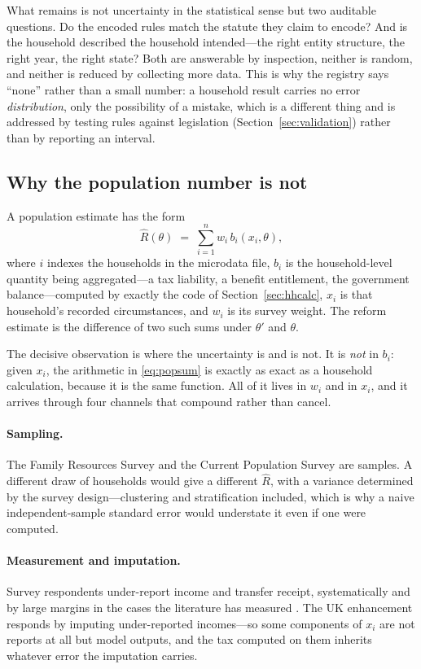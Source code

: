 What remains is not uncertainty in the statistical sense but two auditable questions. Do the encoded rules match the statute they claim to encode? And is the household described the household intended---the right entity structure, the right year, the right state? Both are answerable by inspection, neither is random, and neither is reduced by collecting more data. This is why the registry says ``none'' rather than a small number: a household result carries no error \emph{distribution}, only the possibility of a mistake, which is a different thing and is addressed by testing rules against legislation (Section~\ref{sec:validation}) rather than by reporting an interval.

\subsection{Why the population number is not}

A population estimate has the form
\begin{equation}
  \widehat{R}(\theta) \;=\; \sum_{i=1}^{n} w_i \, b_i(x_i, \theta),
  \label{eq:popsum}
\end{equation}
where $i$ indexes the households in the microdata file, $b_i$ is the household-level quantity being aggregated---a tax liability, a benefit entitlement, the government balance---computed by exactly the code of Section~\ref{sec:hhcalc}, $x_i$ is that household's recorded circumstances, and $w_i$ is its survey weight. The reform estimate is the difference of two such sums under $\theta'$ and $\theta$.

The decisive observation is where the uncertainty is and is not. It is \emph{not} in $b_i$: given $x_i$, the arithmetic in \eqref{eq:popsum} is exactly as exact as a household calculation, because it is the same function. All of it lives in $w_i$ and in $x_i$, and it arrives through four channels that compound rather than cancel.

\paragraph{Sampling.} The Family Resources Survey and the Current Population Survey are samples. A different draw of households would give a different $\widehat{R}$, with a variance determined by the survey design---clustering and stratification included, which is why a naive independent-sample standard error would understate it even if one were computed.

\paragraph{Measurement and imputation.} Survey respondents under-report income and transfer receipt, systematically and by large margins in the cases the literature has measured \citep{meyer2015, brewer2017}. The UK enhancement responds by imputing under-reported incomes---so some components of $x_i$ are not reports at all but model outputs, and the tax computed on them inherits whatever error the imputation carries.

